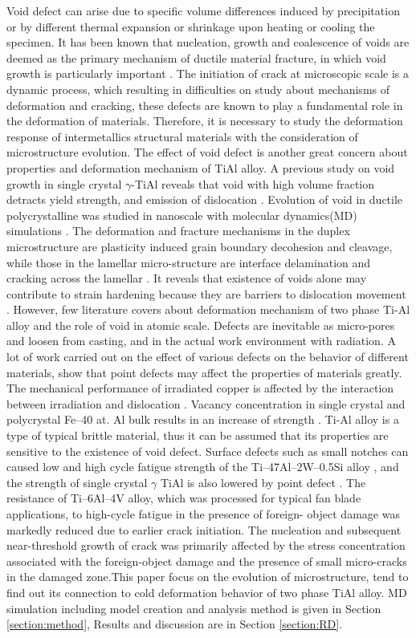 \documentclass[Unknown,article,submit,moreauthors,pdftex,10pt,a4paper]{Definitions/mdpi}
\begin{document}
Void defect can arise due to specific volume differences induced by precipitation or by different thermal expansion or shrinkage upon heating or cooling the specimen. It has been known that nucleation, growth and coalescence of voids are deemed as the primary mechanism of ductile material fracture, in which void growth is particularly important \cite{Hempel2017a}. The initiation of crack at microscopic scale is a dynamic process, which resulting in difficulties on study about  mechanisms of deformation and cracking, these defects are known to play a fundamental role in the deformation of materials.  Therefore, it is necessary to study the deformation response of intermetallics structural materials with the consideration of microstructure evolution. The effect of void defect is another great concern about properties and deformation mechanism  of TiAl alloy. A previous study on void growth in single crystal $\gamma$-TiAl reveals that void with high volume fraction detracts yield strength, and emission of dislocation \cite{Tang2014, Xu2011}. Evolution of void in ductile polycrystalline was studied in nanoscale with molecular dynamics(MD) simulations \cite{Jing2018a,Elkhateeb2018}. The deformation and fracture mechanisms in the duplex microstructure are plasticity induced grain boundary decohesion and cleavage, while those in the lamellar micro-structure are interface delamination and cracking across the lamellar \cite{Tang2014}. It reveals that existence of voids alone may contribute to strain hardening because they are barriers to dislocation movement \cite{Xiong2015}. However, few literature covers about deformation mechanism of two phase Ti-Al alloy and the role of void in atomic scale. Defects are inevitable as micro-pores and loosen from casting, and in the actual work environment with radiation. A lot of work carried out on the  effect of various defects on the behavior of different materials, show that point defects may affect the properties of materials greatly. The mechanical performance of irradiated copper is affected by the interaction between irradiation and dislocation \cite{Kiener2011}. Vacancy concentration in single crystal and polycrystal Fe–40 at. Al bulk results in an increase of strength \cite{Yang1998}. Ti-Al alloy is a type of typical brittle material, thus it can be assumed that its properties are sensitive to the existence of void defect. Surface defects such as small notches can caused low and high cycle fatigue strength of the Ti–47Al–2W–0.5Si alloy \cite{Nazmy2001}, and the strength of single crystal $\gamma$  TiAl is also lowered by point defect \cite{Wu2016}. The resistance of Ti–6Al–4V alloy, which was processed for typical fan blade applications, to high-cycle fatigue in the presence of foreign- object damage was markedly reduced due to earlier crack initiation.  The nucleation and subsequent near-threshold growth of crack was primarily affected by the stress concentration associated with the foreign-object damage and the presence of small micro-cracks in the damaged zone.This paper focus on the evolution of microstructure, tend to find out its connection to cold deformation behavior of two phase TiAl alloy. MD simulation including model creation and analysis method is given in Section \ref{section:method}, Results and discussion are in Section \ref{section:RD}.
\end{document}

